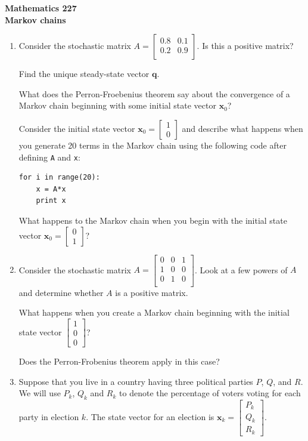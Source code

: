 \documentclass[12pt]{article}
\newcommand{\vs}[1]{\vspace{#1in}}
\newcommand{\qvec}{{\mathbf q}}
\newcommand{\xvec}{{\mathbf x}}
\newcommand{\twovec}[2]{\left[\begin{array}{r}#1 \\ #2
    \end{array}\right]}
\newcommand{\threevec}[3]{\left[\begin{array}{r}#1 \\ #2 \\ #3
  \end{array}\right]}
\begin{document}
\noindent
{\bf Mathematics 227} \\ 
{\bf Markov chains}

\begin{enumerate}
\item Consider the stochastic matrix
  $A =
  \left[
    \begin{array}{cc}
      0.8 & 0.1 \\
      0.2 & 0.9 \\
    \end{array}
  \right]
  $.  Is this a positive matrix?

  \vs{1}
  Find the unique steady-state vector $\qvec$.

  \vs{1}
  What does the Perron-Froebenius theorem say about the convergence of
  a Markov chain beginning with some initial state vector $\xvec_0$?

  \vs{1}
  Consider the initial state vector $\xvec_0 = \twovec10$ and describe
  what happens when you
  generate 20 terms in the Markov chain using the following code after
  defining {\tt A} and {\tt x}:
\begin{verbatim}
for i in range(20):
    x = A*x
    print x
\end{verbatim}

  \vs{1}
  What happens to the Markov chain when you begin with the initial
  state vector 
  $\xvec_0=\twovec01$?

  \vs{1}
\item Consider the stochastic matrix
  $A =
  \left[
    \begin{array}{ccc}
      0 & 0 & 1 \\
      1 & 0 & 0 \\
      0 & 1 & 0 \\
    \end{array}
  \right]
  $.
  Look at a few powers of $A$ and determine whether $A$ is a positive
  matrix.

  \vs{1}
  What happens when you create a Markov chain beginning with the
  initial state vector $\threevec100$?

  \vs{1}
  Does the Perron-Frobenius theorem apply in this case?

  \vs{1}
\item Suppose that you live in a country having three political
  parties $P$, $Q$, and $R$.  We will use $P_k$, $Q_k$ and $R_k$ to
  denote the percentage of voters voting for each party in election
  $k$.  The state vector for an election is
  $\xvec_k = \threevec{P_k}{Q_k}{R_k}$.
  

\end{enumerate}
\end{document}
